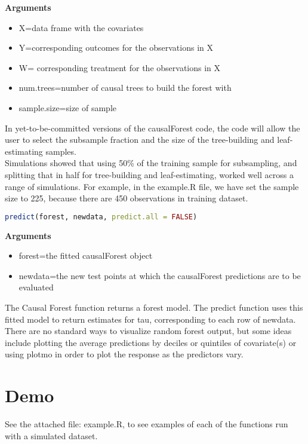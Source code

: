 \documentclass{article}
\begin{document}
\textbf{Arguments} \\
\begin{itemize}
  \item X=data frame with the covariates
  \item Y=corresponding outcomes for the observations in X
  \item W= corresponding treatment for the observations in X  
  \item num.trees=number of causal trees to build the forest with 
  \item sample.size=size of sample 
\end{itemize}

In yet-to-be-committed versions of the causalForest code, the code will allow the user to select the subsample fraction and the size of the tree-building and leaf-estimating samples.  \\
Simulations showed that using 50\% of the training sample for subsampling, and splitting that in half for tree-building and leaf-estimating, worked well across a range of simulations. For example, in the example.R file, we have set the sample size to 225, because there are 450 observations in training dataset.

\begin{lstlisting}[language=R]
predict(forest, newdata, predict.all = FALSE)
\end{lstlisting}

\textbf{Arguments} \\
\begin{itemize}
  \item forest=the fitted causalForest object
  \item newdata=the new test points at which the causalForest predictions are to be evaluated 
\end{itemize}

The Causal Forest function returns a forest model. The predict function uses this fitted model to return estimates for tau, corresponding to each row of newdata.
There are no standard ways to visualize random forest output, but some ideas include plotting the average predictions by deciles or quintiles of covariate(s) or using plotmo in order to plot the response as the predictors vary.

 \section{Demo}
 See the attached file: example.R, to see examples of each of the functions run with a simulated dataset. 
 
 
\end{document}
